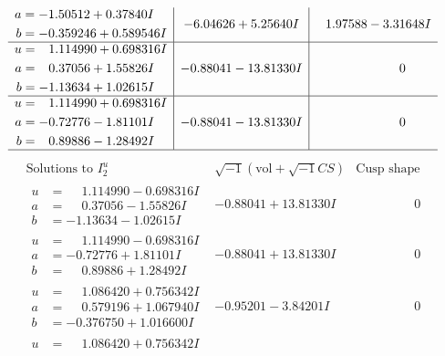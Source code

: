 \documentclass[1p]{elsarticle_modified}
\theoremstyle{definition}
\newcommand{\I}{\sqrt{-1}}
\begin{document}
$$\begin{array}{c|c|c}
\begin{aligned}
a &= -1.50512 + 0.37840 I \\
b &= -0.359246 + 0.589546 I\end{aligned}
 & -6.04626 + 5.25640 I & \phantom{-}1.97588 - 3.31648 I \\ \hline\begin{aligned}
u &= \phantom{-}1.114990 + 0.698316 I \\
a &= \phantom{-}0.37056 + 1.55826 I \\
b &= -1.13634 + 1.02615 I\end{aligned}
 & -0.88041 - 13.81330 I & \phantom{-0.000000 } 0 \\ \hline\begin{aligned}
u &= \phantom{-}1.114990 + 0.698316 I \\
a &= -0.72776 - 1.81101 I \\
b &= \phantom{-}0.89886 - 1.28492 I\end{aligned}
 & -0.88041 - 13.81330 I & \phantom{-0.000000 } 0\\
 \hline 
 \end{array}$$\newpage$$\begin{array}{c|c|c}  
\text{Solutions to }I^u_{2}& \I (\text{vol} + \sqrt{-1}CS) & \text{Cusp shape}\\
 \hline 
\begin{aligned}
u &= \phantom{-}1.114990 - 0.698316 I \\
a &= \phantom{-}0.37056 - 1.55826 I \\
b &= -1.13634 - 1.02615 I\end{aligned}
 & -0.88041 + 13.81330 I & \phantom{-0.000000 } 0 \\ \hline\begin{aligned}
u &= \phantom{-}1.114990 - 0.698316 I \\
a &= -0.72776 + 1.81101 I \\
b &= \phantom{-}0.89886 + 1.28492 I\end{aligned}
 & -0.88041 + 13.81330 I & \phantom{-0.000000 } 0 \\ \hline\begin{aligned}
u &= \phantom{-}1.086420 + 0.756342 I \\
a &= \phantom{-}0.579196 + 1.067940 I \\
b &= -0.376750 + 1.016600 I\end{aligned}
 & -0.95201 - 3.84201 I & \phantom{-0.000000 } 0 \\ \hline\begin{aligned}
u &= \phantom{-}1.086420 + 0.756342 I \\

\end{aligned}
\end{array}$$
\end{document}
